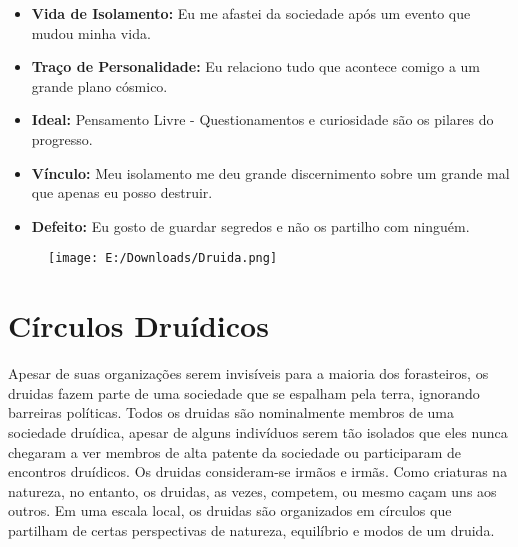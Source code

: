 \documentclass[a4paper,12p]{book}
\begin{document}
\begin{multicols}{2}
	\begin{itemize}
		\item \textbf{Vida de Isolamento:} Eu me afastei da sociedade após um evento que mudou minha vida.
		
		\item \textbf{Traço de Personalidade:} Eu relaciono tudo que acontece comigo a um grande plano cósmico.
		
		\item \textbf{Ideal:} Pensamento Livre - Questionamentos e curiosidade são os pilares do progresso.
		
		\item \textbf{Vínculo:} Meu isolamento me deu grande discernimento sobre um grande mal que apenas eu posso destruir.
		
		\item \textbf{Defeito:} Eu gosto de guardar segredos e não os partilho com ninguém.
		
		
		
	\end{itemize}
	
	
	
	\end{multicols}
	\begin{figure}[H]
		\centering
		\texttt{[image: E:/Downloads/Druida.png]}
	\end{figure}
	
	
	\section{Círculos Druídicos}
		Apesar de suas organizações serem invisíveis para a maioria dos forasteiros, os druidas fazem parte de uma sociedade que se espalham pela terra, ignorando barreiras políticas. Todos os druidas são nominalmente membros de uma sociedade druídica, apesar de alguns indivíduos serem tão isolados que eles nunca chegaram a ver membros de alta patente da sociedade ou participaram de encontros druídicos. Os druidas consideram-se irmãos e irmãs. Como criaturas na natureza, no entanto, os druidas, as vezes, competem, ou mesmo caçam uns aos outros.
		Em uma escala local, os druidas são organizados em círculos que partilham de certas perspectivas de natureza, equilíbrio e modos de um druida.
		
\end{document}
